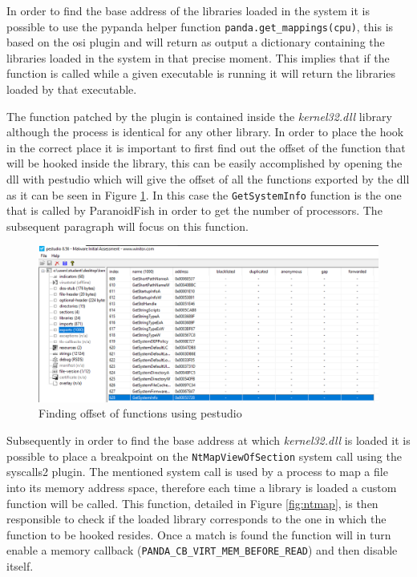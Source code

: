In order to find the base address of the libraries loaded in the system it is possible to use the pypanda helper function \lstinline{panda.get_mappings(cpu)}, this is based on the osi plugin and will return as output a dictionary containing the 
libraries loaded in the system in that precise moment. This implies that if the function is called while a given executable is running it will return the libraries loaded by that executable. 

The function patched by the plugin is contained inside the \textit{kernel32.dll} library although the process is identical for any other library. In order to place the hook in the correct place it is important to first find out the offset of the function that will be hooked inside the library, this can be easily accomplished by opening the dll with pestudio which will give the offset of all the functions exported by the dll as it can be seen in Figure \ref{fig:pestudio}. In this case the \lstinline{GetSystemInfo} function is the one that is called by ParanoidFish in order to get the number of processors. The subsequent paragraph will focus on this function. 

\noindent
\begin{figure}[htp]
\centering
\includegraphics[width=\linewidth]{images/pestudio.png}
\caption{Finding offset of functions using pestudio}
\label{fig:pestudio}
\end{figure}

Subsequently in order to find the base address at which \textit{kernel32.dll} is loaded it is possible to place a breakpoint on the \lstinline{NtMapViewOfSection} system call using the syscalls2 plugin. The mentioned system call is used by a process to map a file into its memory address space, therefore each time a library is loaded a custom function will be called. This function, detailed in Figure \ref{fig:ntmap}, is then responsible to check if the loaded library corresponds to the one in which the function to be hooked resides. Once a match is found the function will in turn enable a memory callback (\lstinline{PANDA_CB_VIRT_MEM_BEFORE_READ}) and then disable itself.

